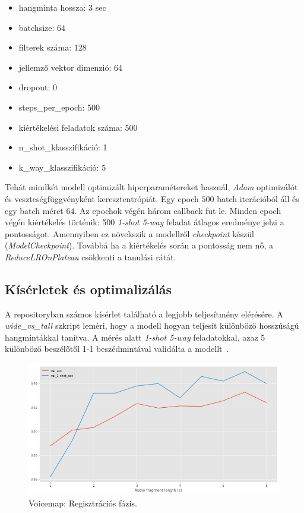 \begin{itemize}
	\item hangminta hossza: 3 sec
	\item batchsize: 64
	\item filterek száma: 128
	\item jellemző vektor dimenzió: 64
	\item dropout: 0
	\item steps\_per\_epoch: 500
	\item kiértékelési feladatok száma: 500
	\item n\_shot\_klasszifikáció: 1
	\item k\_way\_klasszifikáció: 5
\end{itemize}

Tehát mindkét modell optimizált hiperparamétereket használ, \emph{Adam} optimizálót és veszteségfüggvényként keresztentrópiát. Egy epoch $500$ batch iterációból áll és egy batch méret $64$.
Az epochok végén három callback fut le.
\newline
\newline
Minden epoch végén kiértékelés történik: 500 \emph{1-shot 5-way} feladat átlagos eredménye jelzi a pontosságot. Amennyiben ez növekszik a modellről \emph{checkpoint} készül (\emph{ModelCheckpoint}).
Továbbá ha a kiértékelés során a pontosság nem nő, a \emph{ReduceLROnPlateau} csökkenti a tanulási rátát.


\subsection{Kísérletek és optimalizálás} \label{section:voicemap_expermiments}

A repositoryban számos kísérlet található a legjobb teljesítmény elérésére. A \emph{wide\_vs\_tall} szkript leméri, hogy a modell hogyan teljesít különböző hosszúságú hangmintákkal tanítva. A mérés alatt \emph{1-shot 5-way} feladatokkal, azaz 5 különböző beszélőtől 1-1 beszédmintával validálta a modellt~\cite{voicemap_medium}.

\begin{figure}[!ht]
	\centering
	\includegraphics[width=150mm, keepaspectratio]{figures/voicemap-wide-vs-tall.png}
	\caption{Voicemap: Regisztrációs fázis.}
	\label{fig:voicemap-wide-vs-tall}
\end{figure}

